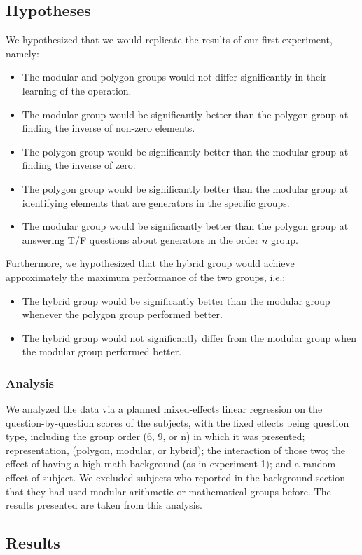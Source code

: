 \documentclass[11pt]{article}
\begin{document}
\subsection{Hypotheses}
We hypothesized that we would replicate the results of our first experiment, namely: 
\begin{itemize} 
\item The modular and polygon groups would not differ significantly in their learning of the operation.
\item The modular group would be significantly better than the polygon group at finding the inverse of non-zero elements.
\item The polygon group would be significantly better than the modular group at finding the inverse of zero.
\item The polygon group would be significantly better than the modular group at identifying elements that are generators in the specific groups.
\item The modular group would be significantly better than the polygon group at answering T/F questions about generators in the order $n$ group.
\end{itemize}
Furthermore, we hypothesized that the hybrid group would achieve approximately the maximum performance of the two groups, i.e.: %
\begin{itemize}
\item The hybrid group would be significantly better than the modular group whenever the polygon group performed better.
\item The hybrid group would not significantly differ from the modular group when the modular group performed better.
\end{itemize}
\subsubsection{Analysis}
We analyzed the data via a planned mixed-effects linear regression on the question-by-question scores of the subjects, with the fixed effects being question type, including the group order (6, 9, or n) in which it was presented; representation, (polygon, modular, or hybrid); the interaction of those two; the effect of having a high math background (as in experiment 1); and a random effect of subject. We excluded subjects who reported in the background section that they had used modular arithmetic or mathematical groups before. The results presented are taken from this analysis.
\subsection{Results}
\end{document}
